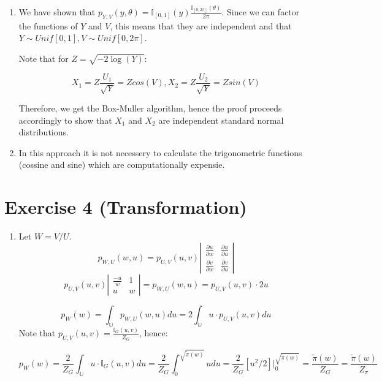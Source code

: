 \documentclass[12pt,letterpaper]{article}
\begin{document}
\begin{enumerate}[leftmargin=!,labelindent=5pt]
	\item We have shown that $p_{Y,V}(y,\theta) =
	\mathbb{I}_{[0,1]}(y)\frac{\mathbb{I}_{[0,2\pi]}(\theta)}{2\pi}$.
	Since we can factor the functions of $Y$ and $V$, this means
	that they are independent and that
	$Y \sim Unif[0,1], V \sim Unif[0,2\pi]$.

	Note that for $Z = \sqrt{-2\log(Y)}$:

	$$ X_1 = Z\frac{U_1}{\sqrt Y} = Z cos(V) , X_2
	= Z\frac{U_2}{\sqrt Y} = Z sin(V)$$

	Therefore, we get the Box-Muller algorithm, hence the proof proceeds
	accordingly to show that $X_1$ and $X_2$ are independent standard
	normal distributions.


	\item In this approach it is not necessery to calculate the 
	trigonometric functions (cossine and sine) which are computationally
	expensie.

\end{enumerate}

\newpage
\section*{Exercise 4 (Transformation)}
\begin{enumerate}[leftmargin=!,labelindent=5pt]

	\item Let $W = V/U$.
	$$p_{W,U}(w,u) = p_{U,V}(u,v)
	\left|\begin{array}{ccc}
	\frac{\partial u}{\partial w} & \frac{\partial u}{\partial u}
	\\
	\frac{\partial v}{\partial w} & \frac{\partial v}{\partial u}
	\end{array}\right|$$ 
	$$p_{U,V}(u,v)
	\left|\begin{array}{ccc}
	\frac{-u}{w} & 1
	\\
	u & w
	\end{array}\right| = 
	p_{W,U}(w,u) = p_{U,V}(u,v)\cdot 2u $$

	$$ p_W(w) = \int_{\mathbb{U}}p_{W,U}(w,u)du =
	2\int_{\mathbb{U}}u\cdot p_{U,V}(u,v)du$$
	Note that $p_{U,V}(u,v) = \frac{\mathbb{I}_G(u,v)}{Z_G}$, hence:

	$$ p_W(w) =
	\frac{2}{Z_G}\int_{\mathbb{U}}u\cdot \mathbb{I}_G(u,v)du = 
	\frac{2}{Z_G}\int_{0}^{\sqrt{\tilde{\pi}(w)}}u du =
	\frac{2}{Z_G}[u^2/2]\Bigr|_0^{\sqrt{\tilde{\pi}(w)}} =
	\frac{\tilde{\pi}(w)}{Z_G} = \frac{\tilde{\pi}(w)}{Z_\pi} 
	$$



\end{enumerate}
\end{document}
